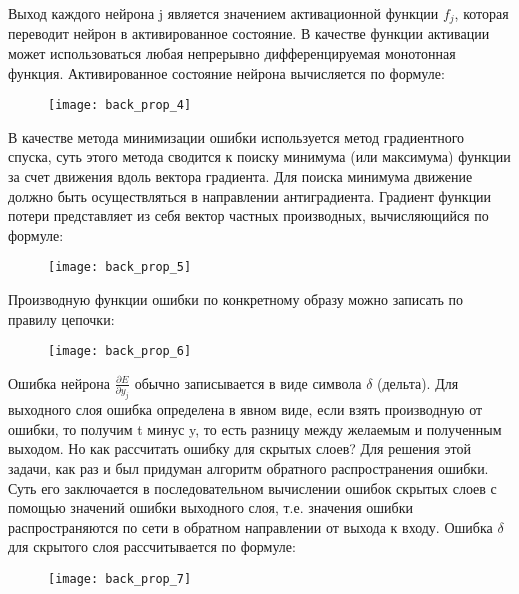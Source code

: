 \documentclass[11pt,colorlinks=true]{article}
\begin{document}
Выход каждого нейрона j является значением активационной функции $f_j$, которая переводит нейрон в активированное состояние. В качестве функции активации может использоваться любая непрерывно дифференцируемая монотонная функция. Активированное состояние нейрона вычисляется по формуле:
\begin{figure}[!h]
	\begin{center}
		\begin{minipage}[!h]{1\linewidth}
			\texttt{[image: back\_prop\_4]}
		\end{minipage}
	\end{center}
\end{figure}

В качестве метода минимизации ошибки используется метод градиентного спуска, суть этого метода сводится к поиску минимума (или максимума) функции за счет движения вдоль вектора градиента. Для поиска минимума движение должно быть осуществляться в направлении антиградиента. Градиент функции потери представляет из себя вектор частных производных, вычисляющийся по формуле:
\begin{figure}[!h]
	\begin{center}
		\begin{minipage}[!h]{1\linewidth}
			\texttt{[image: back\_prop\_5]}
		\end{minipage}
	\end{center}
\end{figure}

Производную функции ошибки по конкретному образу можно записать по правилу цепочки:
\begin{figure}[!h]
	\begin{center}
		\begin{minipage}[!h]{1\linewidth}
			\texttt{[image: back\_prop\_6]}
		\end{minipage}
	\end{center}
\end{figure}

Ошибка нейрона $\frac{\partial E}{\partial y_j}$  обычно записывается в виде символа $\delta$ (дельта). Для выходного слоя ошибка определена в явном виде, если взять производную от ошибки, то получим t минус y, то есть разницу между желаемым и полученным выходом. Но как рассчитать ошибку для скрытых слоев? Для решения этой задачи, как раз и был придуман алгоритм обратного распространения ошибки. Суть его заключается в последовательном вычислении ошибок скрытых слоев с помощью значений ошибки выходного слоя, т.е. значения ошибки распространяются по сети в обратном направлении от выхода к входу. 
Ошибка $\delta$ для скрытого слоя рассчитывается по формуле:
\begin{figure}[!h]
	\begin{center}
		\begin{minipage}[!h]{1\linewidth}
			\texttt{[image: back\_prop\_7]}
		\end{minipage}
	\end{center}
\end{figure}
\end{document}
